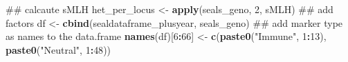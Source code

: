 \documentclass[]{article}
\newenvironment{Shaded}{\begin{snugshade}}{\end{snugshade}}
\newcommand{\KeywordTok}[1]{\textcolor[rgb]{0.13,0.29,0.53}{\textbf{#1}}}
\newcommand{\DecValTok}[1]{\textcolor[rgb]{0.00,0.00,0.81}{#1}}
\newcommand{\StringTok}[1]{\textcolor[rgb]{0.31,0.60,0.02}{#1}}
\newcommand{\OperatorTok}[1]{\textcolor[rgb]{0.81,0.36,0.00}{\textbf{#1}}}
\newcommand{\NormalTok}[1]{#1}
\begin{document}
\begin{Shaded}
\begin{Highlighting}[]
\NormalTok{## calcaute sMLH}
\NormalTok{het_per_locus <-}\StringTok{ }\KeywordTok{apply}\NormalTok{(seals_geno, }\DecValTok{2}\NormalTok{, sMLH)}
\NormalTok{## add factors }
\NormalTok{df <-}\StringTok{  }\KeywordTok{cbind}\NormalTok{(sealdataframe_plusyear, seals_geno) }
\NormalTok{## add marker type as names to the data.frame}
\KeywordTok{names}\NormalTok{(df)[}\DecValTok{6}\OperatorTok{:}\DecValTok{66}\NormalTok{] <-}\StringTok{ }\KeywordTok{c}\NormalTok{(}\KeywordTok{paste0}\NormalTok{(}\StringTok{"Immune"}\NormalTok{, }\DecValTok{1}\OperatorTok{:}\DecValTok{13}\NormalTok{), }\KeywordTok{paste0}\NormalTok{(}\StringTok{"Neutral"}\NormalTok{, }\DecValTok{1}\OperatorTok{:}\DecValTok{48}\NormalTok{))}


\end{Highlighting}
\end{Shaded}
\end{document}
